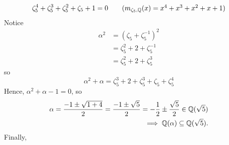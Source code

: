 \begin{example}
    \[\zeta_5^4 + \zeta_5^3 + \zeta_5^2 + \zeta_5 + 1 = 0 \tag{$m_{\zeta_5,\Q}(x) = x^4+x^3+x^2+x+1$}\]
    Notice
    \begin{align*}
        \alpha^2 &= (\zeta_5 + \zeta_5^{-1})^2 \\
        &= \zeta_5^2 + 2 + \zeta_5^{-1} \\
        &= \zeta_5^2 + 2 + \zeta_5^3
    \end{align*}
    so
    \[\alpha^2 + \alpha = \zeta_5^3 + 2 + \zeta_5^3 + \zeta_5 + \zeta_5^4\]
    Hence, $\alpha^2+\alpha - 1 = 0$, so 
    \begin{align*}
        \alpha = \dfrac{-1 \pm \sqrt{1+4}}{2} = \dfrac{-1 \pm \sqrt{5}}{2} = -\dfrac{1}{2} \pm \dfrac{\sqrt{5}}{2} \in \mathbb{Q}(\sqrt{5}) \\ 
        \implies \mathbb{Q}(\alpha) \subseteq \mathbb{Q}(\sqrt{5}).
    \end{align*}
    Finally,\\
    \begin{center}
    \end{center}
\end{example}

